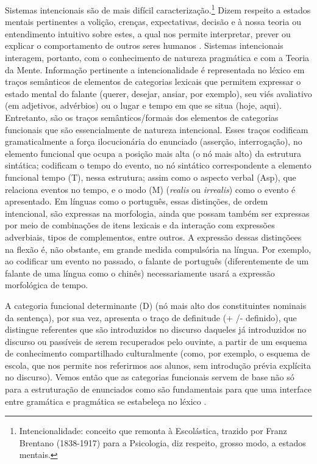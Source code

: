 \documentclass[output=paper,colorlinks,citecolor=brown,booklanguage=portuguese]{langscibook}
\begin{document}
Sistemas intencionais são de mais difícil caracterização.\footnote{Intencionalidade: conceito que remonta à Escolástica, trazido por Franz Brentano (1838-1917) para a Psicologia, diz respeito, grosso modo, a estados mentais.} Dizem respeito a estados mentais pertinentes a volição, crenças, expectativas, decisão e à nossa teoria ou entendimento intuitivo sobre estes, a qual nos permite interpretar, prever ou explicar o comportamento de outros seres humanos \citep{Dennett1971}. Sistemas intencionais interagem, portanto, com o conhecimento de natureza pragmática e com a Teoria da Mente. Informação pertinente a intencionalidade é representada no léxico em traços semânticos de elementos de categorias lexicais que permitem expressar o estado mental do falante (querer, desejar, ansiar, por exemplo), seu viés avaliativo (em adjetivos, advérbios) ou o lugar e tempo em que se situa (hoje, aqui). Entretanto, são os traços semânticos/formais dos elementos de categorias funcionais que são essencialmente de natureza intencional. Esses traços codificam gramaticalmente a força ilocucionária do enunciado (asserção, interrogação), no elemento funcional que ocupa a posição mais alta (o nó mais alto) da estrutura sintática; codificam o tempo do evento, no nó sintático correspondente a elemento funcional tempo (T), nessa estrutura; assim como o aspecto verbal (Asp), que relaciona eventos no tempo, e o modo (M) (\emph{realis} ou \emph{irrealis}) como o evento é apresentado. Em línguas como o português, essas distinções, de ordem intencional, são expressas na morfologia, ainda que possam também ser expressas por meio de combinações de itens lexicais e da interação com expressões adverbiais, tipos de complementos, entre outros. A expressão dessas distinçõees na flexão é, não obstante, em grande medida compulsória na língua. Por exemplo, ao codificar um evento no passado, o falante de português (diferentemente de um falante de uma língua como o chinês) necessariamente usará a expressão morfológica de tempo. 

A categoria funcional determinante (D) (nó mais alto dos constituintes nominais da sentença), por sua vez, apresenta o traço de definitude (+ /- definido), que distingue referentes que são introduzidos no discurso daqueles já introduzidos no discurso ou passíveis de serem recuperados pelo ouvinte, a partir de um esquema de conhecimento compartilhado culturalmente (como, por exemplo, o esquema de escola, que nos permite nos referirmos aos alunos, sem introdução prévia explícita no discurso). Vemos então que as categorias funcionais servem de base não só para a estruturação de enunciados como são fundamentais para que uma interface entre gramática e pragmática se estabeleça no léxico \citep{Correa2005, Correa2008}.
\end{document}
